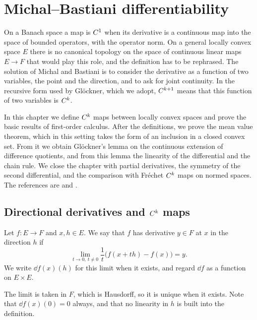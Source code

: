 \chapter{Michal--Bastiani differentiability}
\label{chap:differentiability}

On a Banach space a map is $C^{1}$ when its derivative is a continuous map into the space of
bounded operators, with the operator norm. On a general locally convex space $E$ there is no
canonical topology on the space of continuous linear maps $E \to F$ that would play this role,
and the definition has to be rephrased. The solution of Michal \cite{Mic38} and Bastiani
\cite{Bas64} is to consider the derivative as a function of two variables, the point and the
direction, and to ask for joint continuity. In the recursive form used by Glöckner, which we
adopt, $C^{k+1}$ means that this function of two variables is $C^{k}$.

In this chapter we define $C^{k}$ maps between locally convex spaces and prove the basic
results of first-order calculus. After the definitions, we prove the mean value theorem, which
in this setting takes the form of an inclusion in a closed convex set. From it we obtain
Glöckner's lemma on the continuous extension of difference quotients, and from this lemma the
linearity of the differential and the chain rule. We close the chapter with partial
derivatives, the symmetry of the second differential, and the comparison with Fréchet $C^{k}$
maps on normed spaces. The references are \cite[\S1.2]{GN26} and \cite[\S I.2]{Nee06}.

\section{Directional derivatives and $C^{k}$ maps}

\begin{definition}
  \label{def:dir-deriv}
  \leanok
  Let $f \colon E \to F$ and $x, h \in E$. We say that $f$ has derivative $y \in F$ at $x$ in
  the direction $h$ if
  \[
    \lim_{t \to 0,\ t \neq 0} \frac{1}{t}\bigl(f(x + t h) - f(x)\bigr) = y .
  \]
  We write $\dd f(x)(h)$ for this limit when it exists, and regard $\dd f$ as a function on
  $E \times E$.
\end{definition}

The limit is taken in $F$, which is Hausdorff, so it is unique when it exists. Note that
$\dd f(x)(0) = 0$ always, and that no linearity in $h$ is built into the definition.

